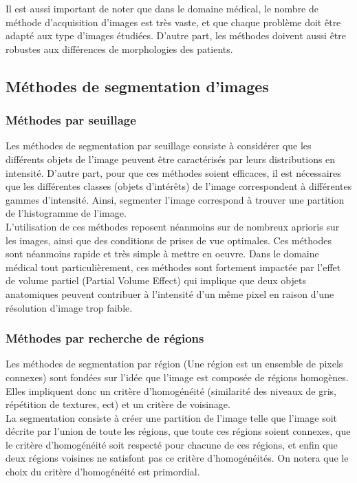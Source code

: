 Il est aussi important de noter que dans le domaine médical, le nombre de méthode d'acquisition d'images est très vaste, et que chaque problème doit être adapté aux type d'images étudiées. D'autre part, les méthodes doivent aussi être robustes aux différences de morphologies des patients.


\subsection{Méthodes de segmentation d'images}
\subsubsection*{Méthodes par seuillage}
Les méthodes de segmentation par seuillage consiste à considérer que les différents objets de l'image peuvent être caractérisés par leurs distributions en intensité. D'autre part, pour que ces méthodes soient efficaces, il est nécessaires que les différentes classes (objets d'intérêts) de l'image correspondent à différentes gammes d'intensité. Ainsi, segmenter l'image correspond à trouver une partition de l'histogramme de l'image.\\

L'utilisation de ces méthodes reposent néanmoins sur de nombreux aprioris sur les images, ainsi que des conditions de prises de vue optimales. Ces méthodes sont néanmoins rapide et très simple à mettre en oeuvre. Dans le domaine médical tout particulièrement, ces méthodes sont fortement impactée par l'effet de volume partiel (Partial Volume Effect) qui implique que deux objets anatomiques peuvent contribuer à l'intensité d'un même pixel en raison d'une résolution d'image trop faible.

\subsubsection*{Méthodes par recherche de régions}
Les méthodes de segmentation par région (Une région est un ensemble de pixels connexes) sont fondées sur l'idée que l'image est composée de régions homogènes. Elles impliquent donc un critère d'homogénéité (similarité des niveaux de gris, répétition de textures, ect) et un critère de voisinage.\\

La segmentation consiste à créer une partition de l'image telle que l'image soit décrite par l'union de toute les régions, que toute ces régions soient connexes, que le critère d'homogénéité soit respecté pour chacune de ces régions, et enfin que deux régions voisines ne satisfont pas ce critère d'homogénéités. On notera que le choix du critère d'homogénéité est primordial.


